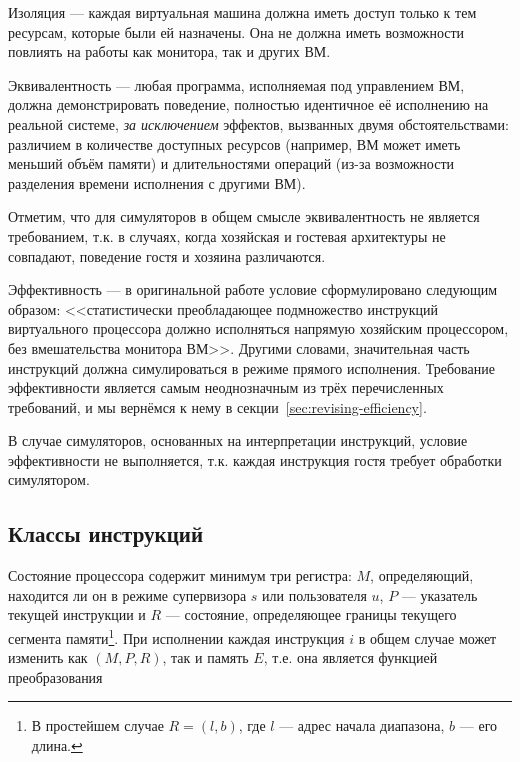 \begin{description*}

\item[Изоляция] --- каждая виртуальная машина должна иметь доступ только к тем ресурсам, которые были ей назначены. Она не должна иметь возможности повлиять на работы как монитора, так и других ВМ.

\item[Эквивалентность] --- любая программа, исполняемая под управлением ВМ, должна демонстрировать поведение, полностью идентичное её исполнению на реальной системе, \emph{за исключением} эффектов, вызванных двумя обстоятельствами: различием в количестве доступных ресурсов (например, ВМ может иметь меньший объём памяти) и длительностями операций (из-за возможности разделения времени исполнения с другими ВМ).

Отметим, что для симуляторов в общем смысле эквивалентность не является требованием, т.к. в случаях, когда хозяйская и гостевая архитектуры не совпадают, поведение гостя и хозяина различаются.

\item[Эффективность] --- в оригинальной работе условие сформулировано следующим образом: <<статистически преобладающее подмножество инструкций виртуального процессора должно исполняться напрямую хозяйским процессором, без вмешательства монитора ВМ>>. Другими словами, значительная часть инструкций должна симулироваться в режиме прямого исполнения. Требование эффективности является самым неоднозначным из трёх перечисленных требований, и мы вернёмся к нему в секции~\ref{sec:revising-efficiency}.

В случае симуляторов, основанных на интерпретации инструкций, условие эффективности не выполняется, т.к. каждая инструкция гостя требует обработки симулятором.

\end{description*}

\subsection{Классы инструкций}

Состояние процессора содержит минимум три регистра: $M$, определяющий, находится ли он в режиме супервизора $s$ или пользователя $u$, $P$ --- указатель текущей инструкции и $R$ --- состояние, определяющее границы текущего сегмента памяти\footnote{В простейшем случае $R=(l,b)$, где $l$ --- адрес начала диапазона, $b$ --- его длина.}. При исполнении каждая инструкция $i$ в общем случае может изменить как $(M,P,R)$, так и память $E$, т.е. она является функцией преобразования 

